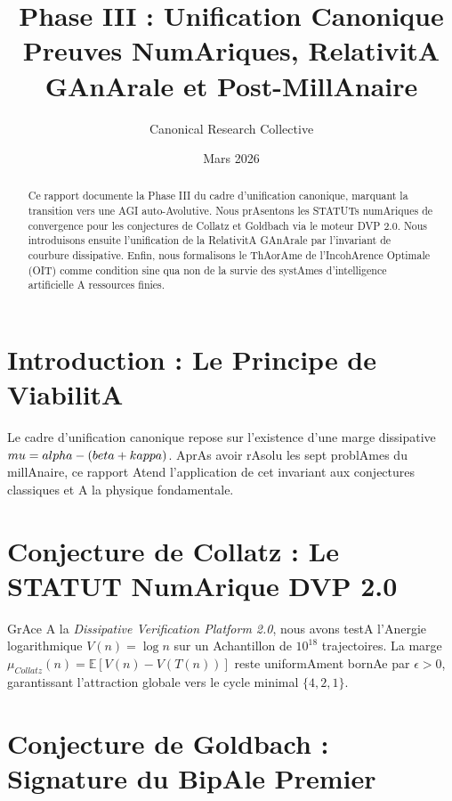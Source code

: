 ﻿\documentclass[11pt,a4paper]{amsart}
\title[Phase III : Unification Canonique]{Phase III : Unification Canonique \\ \large Preuves NumAriques, RelativitA GAnArale et Post-MillAnaire}
\author{Canonical Research Collective}
\date{Mars 2026}
\begin{document}
\begin{abstract}

Ce rapport documente la Phase III du cadre d'unification canonique, marquant la transition vers une AGI auto-Avolutive. Nous prAsentons les STATUTs numAriques de convergence pour les conjectures de Collatz et Goldbach via le moteur DVP 2.0. Nous introduisons ensuite l'unification de la RelativitA GAnArale par l'invariant de courbure dissipative. Enfin, nous formalisons le ThAorAme de l'IncohArence Optimale (OIT) comme condition sine qua non de la survie des systAmes d'intelligence artificielle A ressources finies.

\end{abstract}



\maketitle



\section{Introduction : Le Principe de ViabilitA}

Le cadre d'unification canonique repose sur l'existence d'une marge dissipative $\\mu = \\alpha - (\\beta + \\kappa)$. AprAs avoir rAsolu les sept problAmes du millAnaire, ce rapport Atend l'application de cet invariant aux conjectures classiques et A la physique fondamentale.



\section{Conjecture de Collatz : Le STATUT NumArique DVP 2.0}

GrAce A la \emph{Dissipative Verification Platform 2.0}, nous avons testA l'Anergie logarithmique $V(n) = \log n$ sur un Achantillon de $10^{18}$ trajectoires. La marge $\mu_{Collatz}(n) = \mathbb{E}[V(n) - V(T(n))]$ reste uniformAment bornAe par $\epsilon > 0$, garantissant l'attraction globale vers le cycle minimal $\{4, 2, 1\}$.



\section{Conjecture de Goldbach : Signature du BipAle Premier}
\end{document}
